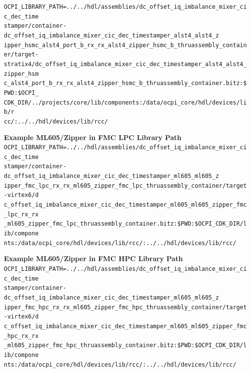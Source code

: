 \documentclass{article}
\begin{document}
\verb|OCPI_LIBRARY_PATH=../../hdl/assemblies/dc_offset_iq_imbalance_mixer_cic_dec_time| \\
\verb|stamper/container-dc_offset_iq_imbalance_mixer_cic_dec_timestamper_alst4_alst4_z| \\
\verb|ipper_hsmc_alst4_port_b_rx_rx_alst4_zipper_hsmc_b_thruassembly_container/target-| \\
\verb|stratix4/dc_offset_iq_imbalance_mixer_cic_dec_timestamper_alst4_alst4_zipper_hsm| \\
\verb|c_alst4_port_b_rx_rx_alst4_zipper_hsmc_b_thruassembly_container.bitz:$PWD:$OCPI_| \\
\verb|CDK_DIR/../projects/core/lib/components:/data/ocpi_core/hdl/devices/lib/r| \\
\verb|cc/:../../hdl/devices/lib/rcc/|
\par\medskip
\noindent\textbf{Example ML605/Zipper in FMC LPC Library Path}\\
\verb|OCPI_LIBRARY_PATH=../../hdl/assemblies/dc_offset_iq_imbalance_mixer_cic_dec_time| \\
\verb|stamper/container-dc_offset_iq_imbalance_mixer_cic_dec_timestamper_ml605_ml605_z| \\
\verb|ipper_fmc_lpc_rx_rx_ml605_zipper_fmc_lpc_thruassembly_container/target-virtex6/d| \\
\verb|c_offset_iq_imbalance_mixer_cic_dec_timestamper_ml605_ml605_zipper_fmc_lpc_rx_rx| \\
\verb|_ml605_zipper_fmc_lpc_thruassembly_container.bitz:$PWD:$OCPI_CDK_DIR/lib/compone| \\
\verb|nts:/data/ocpi_core/hdl/devices/lib/rcc/:../../hdl/devices/lib/rcc/|
\par\medskip
\noindent\textbf{Example ML605/Zipper in FMC HPC Library Path}\\
\verb|OCPI_LIBRARY_PATH=../../hdl/assemblies/dc_offset_iq_imbalance_mixer_cic_dec_time| \\
\verb|stamper/container-dc_offset_iq_imbalance_mixer_cic_dec_timestamper_ml605_ml605_z| \\
\verb|ipper_fmc_hpc_rx_rx_ml605_zipper_fmc_hpc_thruassembly_container/target-virtex6/d| \\
\verb|c_offset_iq_imbalance_mixer_cic_dec_timestamper_ml605_ml605_zipper_fmc_hpc_rx_rx| \\
\verb|_ml605_zipper_fmc_hpc_thruassembly_container.bitz:$PWD:$OCPI_CDK_DIR/lib/compone| \\
\verb|nts:/data/ocpi_core/hdl/devices/lib/rcc/:../../hdl/devices/lib/rcc/|
\pagebreak
\end{document}
